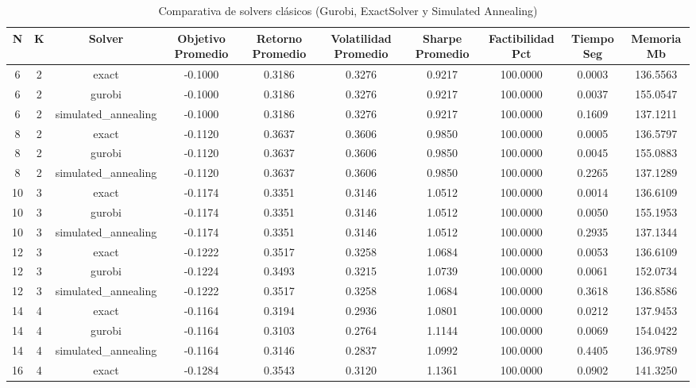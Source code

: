 \begin{table}[htbp]
  \centering
  \caption{Comparativa de solvers clásicos (Gurobi, ExactSolver y Simulated Annealing)}
  \label{tab:resultados_clasicos}
  \begin{tabular}{cccccccccc}
    \toprule
    N & K & Solver & Objetivo Promedio & Retorno Promedio & Volatilidad Promedio & Sharpe Promedio & Factibilidad Pct & Tiempo Seg & Memoria Mb \\
    \midrule
    6 & 2 & exact & -0.1000 & 0.3186 & 0.3276 & 0.9217 & 100.0000 & 0.0003 & 136.5563 \\
    6 & 2 & gurobi & -0.1000 & 0.3186 & 0.3276 & 0.9217 & 100.0000 & 0.0037 & 155.0547 \\
    6 & 2 & simulated\_annealing & -0.1000 & 0.3186 & 0.3276 & 0.9217 & 100.0000 & 0.1609 & 137.1211 \\
    8 & 2 & exact & -0.1120 & 0.3637 & 0.3606 & 0.9850 & 100.0000 & 0.0005 & 136.5797 \\
    8 & 2 & gurobi & -0.1120 & 0.3637 & 0.3606 & 0.9850 & 100.0000 & 0.0045 & 155.0883 \\
    8 & 2 & simulated\_annealing & -0.1120 & 0.3637 & 0.3606 & 0.9850 & 100.0000 & 0.2265 & 137.1289 \\
    10 & 3 & exact & -0.1174 & 0.3351 & 0.3146 & 1.0512 & 100.0000 & 0.0014 & 136.6109 \\
    10 & 3 & gurobi & -0.1174 & 0.3351 & 0.3146 & 1.0512 & 100.0000 & 0.0050 & 155.1953 \\
    10 & 3 & simulated\_annealing & -0.1174 & 0.3351 & 0.3146 & 1.0512 & 100.0000 & 0.2935 & 137.1344 \\
    12 & 3 & exact & -0.1222 & 0.3517 & 0.3258 & 1.0684 & 100.0000 & 0.0053 & 136.6109 \\
    12 & 3 & gurobi & -0.1224 & 0.3493 & 0.3215 & 1.0739 & 100.0000 & 0.0061 & 152.0734 \\
    12 & 3 & simulated\_annealing & -0.1222 & 0.3517 & 0.3258 & 1.0684 & 100.0000 & 0.3618 & 136.8586 \\
    14 & 4 & exact & -0.1164 & 0.3194 & 0.2936 & 1.0801 & 100.0000 & 0.0212 & 137.9453 \\
    14 & 4 & gurobi & -0.1164 & 0.3103 & 0.2764 & 1.1144 & 100.0000 & 0.0069 & 154.0422 \\
    14 & 4 & simulated\_annealing & -0.1164 & 0.3146 & 0.2837 & 1.0992 & 100.0000 & 0.4405 & 136.9789 \\
    16 & 4 & exact & -0.1284 & 0.3543 & 0.3120 & 1.1361 & 100.0000 & 0.0902 & 141.3250 \\

\end{tabular}
\end{table}
